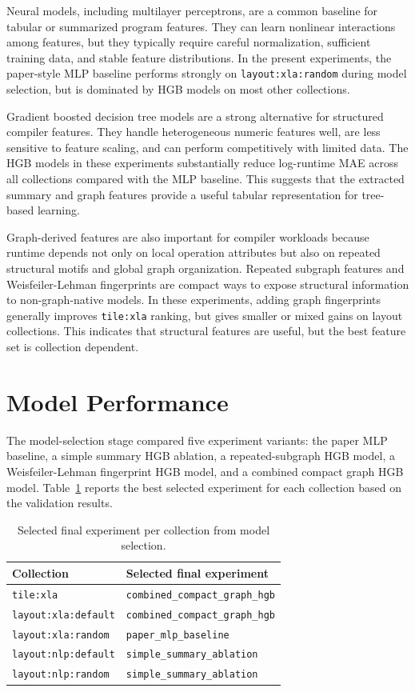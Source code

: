 \documentclass[11pt]{article}
\begin{document}
Neural models, including multilayer perceptrons, are a common baseline for tabular or summarized program features. They can learn nonlinear interactions among features, but they typically require careful normalization, sufficient training data, and stable feature distributions. In the present experiments, the paper-style MLP baseline performs strongly on \texttt{layout:xla:random} during model selection, but is dominated by HGB models on most other collections.

Gradient boosted decision tree models are a strong alternative for structured compiler features. They handle heterogeneous numeric features well, are less sensitive to feature scaling, and can perform competitively with limited data. The HGB models in these experiments substantially reduce log-runtime MAE across all collections compared with the MLP baseline. This suggests that the extracted summary and graph features provide a useful tabular representation for tree-based learning.

Graph-derived features are also important for compiler workloads because runtime depends not only on local operation attributes but also on repeated structural motifs and global graph organization. Repeated subgraph features and Weisfeiler-Lehman fingerprints are compact ways to expose structural information to non-graph-native models. In these experiments, adding graph fingerprints generally improves \texttt{tile:xla} ranking, but gives smaller or mixed gains on layout collections. This indicates that structural features are useful, but the best feature set is collection dependent.

\section{Model Performance}
The model-selection stage compared five experiment variants: the paper MLP baseline, a simple summary HGB ablation, a repeated-subgraph HGB model, a Weisfeiler-Lehman fingerprint HGB model, and a combined compact graph HGB model. Table~\ref{tab:selection} reports the best selected experiment for each collection based on the validation results.

\begin{table}[h]
\centering
\caption{Selected final experiment per collection from model selection.}
\label{tab:selection}
\begin{tabular}{ll}
\toprule
Collection & Selected final experiment \\
\midrule
\texttt{tile:xla} & \texttt{combined\_compact\_graph\_hgb} \\
\texttt{layout:xla:default} & \texttt{combined\_compact\_graph\_hgb} \\
\texttt{layout:xla:random} & \texttt{paper\_mlp\_baseline} \\
\texttt{layout:nlp:default} & \texttt{simple\_summary\_ablation} \\
\texttt{layout:nlp:random} & \texttt{simple\_summary\_ablation} \\
\bottomrule
\end{tabular}
\end{table}
\end{document}
